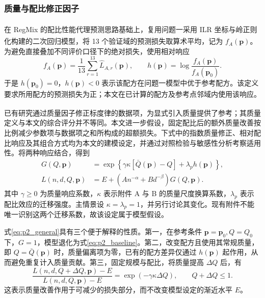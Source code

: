 \documentclass[bwprint]{gmcmthesis}
\numberwithin{equation}{section}
\numberwithin{figure}{section}
\numberwithin{table}{section}
\begin{document}
        \subsubsection{质量与配比修正因子}  %
        在 RegMix 的配比性能代理预测思路基础上\textsuperscript{\cite{liu2025regmix}}，复用问题一采用 ILR 坐标与岭正则化构建的二次回归模型\textsuperscript{\cite{egozcue2003ilr,hoerl1970ridge}}，将 13 个验证域的预测损失取算术平均，记为 $f_A(\bm p)$。为避免直接叠加不同评价口径下的绝对损失，使用相对响应
        \begin{equation}
         f_A(\bm p)=\frac1{13}\sum_{r=1}^{13}\widehat L_{A,r}(\bm p),
         \qquad h(\bm p)=\log\frac{f_A(\bm p)}{f_A(\bm p_0)}.
         \label{eq:p2_mix}
        \end{equation}
        于是 $h(\bm p_0)=0$，$h(\bm p)<0$ 表示该配方在问题一模型中优于参考配方。该定义要求所用配方的预测损失为正；本文在已计算的配方及参考点邻域内使用该响应。
        
        已有研究通过质量因子修正标度律的数据项\textsuperscript{\cite{subramanyam2026quality}}，为显式引入质量提供了参考；其质量定义与本文的综合评分并不等同。本文进一步假设，固定配比后的额外质量改善按比例减少参数项与数据项之和所构成的超额损失。下式中的指数质量修正、相对配比响应及其组合方式均为本文的建模设定，并通过对照检验与敏感性分析考察适用性。将两种响应结合，得到
        \begin{equation}
         \begin{aligned}
         G(Q,\bm p)&=\exp\!\left\{\gamma\kappa[\bar Q(\bm p)-Q]+\lambda_p h(\bm p)\right\},\\
         L(n,d,Q,\bm p)&=E+\left(A n^{-\alpha}+B d^{-\beta}\right)G(Q,\bm p).
         \end{aligned}
         \label{eq:p2_general}
        \end{equation}
        其中 $\gamma\geq0$ 为质量响应系数，$\kappa$ 表示附件 A 与 B 的质量尺度换算系数，$\lambda_p$ 表示配比效应的迁移强度。主情景设 $\kappa=\lambda_p=1$，并另行讨论其变化。现有附件不能唯一识别这两个迁移系数，故该设定属于模型假设。
        
        式\eqref{eq:p2_general}具有三个便于解释的性质。第一，在参考条件 $\bm p=\bm p_0,Q=Q_0$ 下，$G=1$，模型退化为式\eqref{eq:p2_baseline}。第二，改变配方且使用其常规质量，即 $Q=\bar Q(\bm p)$ 时，质量偏离项为零，已有的配方差异仅通过 $h(\bm p)$ 起作用，从而避免重复计入质量贡献。第三，固定规模与配比，将质量提高 $\Delta Q$ 后，有
        \begin{equation}
         \frac{L(n,d,Q+\Delta Q,\bm p)-E}{L(n,d,Q,\bm p)-E}
         =\exp(-\gamma\kappa\Delta Q),\qquad Q+\Delta Q\leq1.
         \label{eq:p2_qchange}
        \end{equation}
        这表示质量改善作用于可减少的损失部分，而不改变模型设定的渐近水平 $E$。
        
\end{document}
